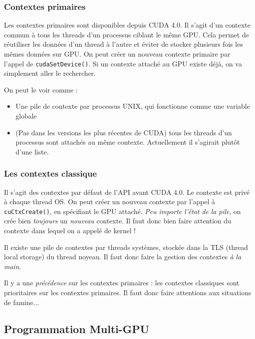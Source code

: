 \documentclass{article}
\begin{document}
\subsubsection{Contextes primaires}
Les contextes primaires sont disponibles depuis CUDA 4.0. Il s'agit d'un contexte commun à tous les threads d'un processus ciblant le même GPU. Cela permet de réutiliser les données d'un thread à l'autre et éviter de stocker plusieurs fois les mêmes données sur GPU.
On peut créer un nouveau contexte primaire par l'appel de \texttt{cudaSetDevice()}. Si un contexte attaché au GPU existe déjà, on va simplement aller le rechercher.

On peut le voir comme :
\begin{itemize}
\item Une pile de contexte par processus UNIX, qui fonctionne comme une variable globale
\item (Pas dans les versions les plus récentes de CUDA) tous les threads d'un processus sont attachés au même contexte. Actuellement il s'agirait plutôt d'une liste.
\end{itemize}

\subsubsection{Les contextes classique}
Il s'agit des contextes par défaut de l'API avant CUDA 4.0. Le contexte est privé à chaque thread OS. On peut créer un nouveau contexte par l'appel à \texttt{cuCtxCreate()}, en spécifiant le GPU attaché. \emph{Peu importe l'état de la pile}, on crée bien \emph{toujours} un \emph{nouveau} contexte. Il faut donc bien faire attention du contexte dans lequel on a appelé de kernel !

Il existe une pile de contextes par threads systèmes, stockée dans la TLS (thread local storage) du thread noyeau. Il faut donc faire la gestion des contextes \emph{à la main}.

Il y a une \emph{précédence} sur les contextes primaires : les contextes classiques sont prioritaires sur les contextes primaires. Il faut donc faire attentions aux situations de famine...


\subsection{Programmation Multi-GPU}
\end{document}
